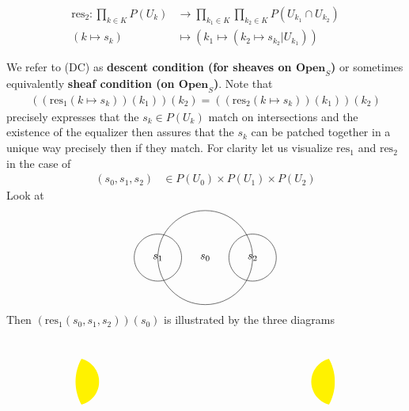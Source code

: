 \begin{exa}
\begin{enumerate}
\begin{align*}
  \mathrm{res}_{2}
  \colon
  \prod_{k \in K}
  P(U_{k})
  &\rightarrow
  \prod_{k_{1} \in K}
  \prod_{k_{2} \in K}
  P
  \left(
    U_{k_{1}}
    \cap
    U_{k_{2}}
  \right)
  \\
  \left(
    k
    \mapsto
    s_{k}
  \right)
  &\mapsto
  \left(
    k_{1}
    \mapsto
    \left(
      k_{2}
      \mapsto
      s_{k_{2}}
      \vert
      U_{k_{1}}
    \right)
  \right)
\end{align*}
\end{enumerate}
We refer to (DC) as \textbf{descent condition (for sheaves on $\mathbf{Open}_{S}$)} or sometimes equivalently \textbf{sheaf condition (on $\mathbf{Open}_{S}$)}. Note that\begin{align*}
  \left(
    \left(
      \mathrm{res}_{1}
      \left(
        k
        \mapsto
        s_{k}
      \right)
    \right)
    (k_{1})
  \right)
  (k_{2})
  =
  \left(
    \left(
      \mathrm{res}_{2}
      \left(
        k
        \mapsto
        s_{k}
      \right)
    \right)
    (k_{1})
  \right)
  (k_{2})
\end{align*}
precisely expresses that the $s_{k} \in P(U_{k})$ match on intersections and the existence of the equalizer then assures that the $s_{k}$ can be patched together in a unique way precisely then if they match. For clarity let us visualize $\mathrm{res}_{1}$ and $\mathrm{res}_{2}$ in the case of
\begin{align*}
  (s_{0},s_{1},s_{2})
  &\in
  P(U_{0})
  \times
  P(U_{1})
  \times
  P(U_{2})
\end{align*}
Look at
\[
\begin{tikzpicture}[scale=0.75]
  \draw
    (0,0)
    circle
    [radius=2]
    node {$s_{0}$};
  \draw
    (-2,0)
    circle
    [radius=1]
    node {$s_{1}$};
  \draw
    (2,0)
    circle
    [radius=1]
    node {$s_{2}$};
\end{tikzpicture}
\]
Then $(\mathrm{res}_{1}(s_{0},s_{1},s_{2}))(s_{0})$ is illustrated by the three diagrams
\[
\begin{tikzpicture}[scale=0.75]
\begin{scope}
  \clip
    (0,0)
    circle
    [radius=2];
  \fill[fill=yellow]
    (-2,0)
    circle
    [radius=1];
  \clip
    (2,0)
    circle
    [radius=1];
\end{scope}
\begin{scope}
  \clip
    (7,0)
    circle
    [radius=2];
  \fill[fill=yellow]
    (9,0)
    circle
    [radius=1];
  \clip
    (5,0)
    circle
    [radius=1];
\end{scope}

\end{tikzpicture}\]
\end{exa}
